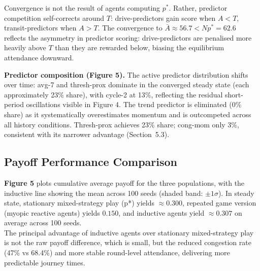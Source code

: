 Convergence is not the result of agents computing $p^*$. Rather, predictor competition self-corrects around $T$: drive-predictors gain score when $A < T$, transit-predictors when $A > T$. The convergence to $\bar{A} \approx 56.7 < Np^* = 62.6$ reflects the asymmetry in predictor scoring: drive-predictors are penalised more heavily above $T$ than they are rewarded below, biasing the equilibrium attendance downward. %

\textbf{Predictor composition (Figure 5).} The active predictor distribution shifts over time: avg-7 and thresh-prox dominate in the converged steady state (each approximately 23\% share), with cycle-2 at 13\%, reflecting the residual short-period oscillations visible in Figure 4. The trend predictor is eliminated (0\% share) as it systematically overestimates momentum and is outcompeted across all history conditions. Thresh-prox achieves 23\% share; cong-mom only 3\%, consistent with its narrower advantage (Section~5.3).\\



\subsection{Payoff Performance Comparison}

\textbf{Figure 5} plots cumulative average payoff for the three populations, with the inductive line showing the mean across 100 seeds (shaded band: $\pm 1\sigma$). In steady state, stationary mixed-strategy play (p*) yields $\approx 0.300$, repeated game version (myopic reactive agents) yields $0.150$, and inductive agents yield $\approx 0.307$ on average across 100 seeds. \\


The principal advantage of inductive agents over stationary mixed-strategy play is not the raw payoff difference, which is small, but the reduced congestion rate (47\% vs 68.4\%) and more stable round-level attendance, delivering more predictable journey times. \\

